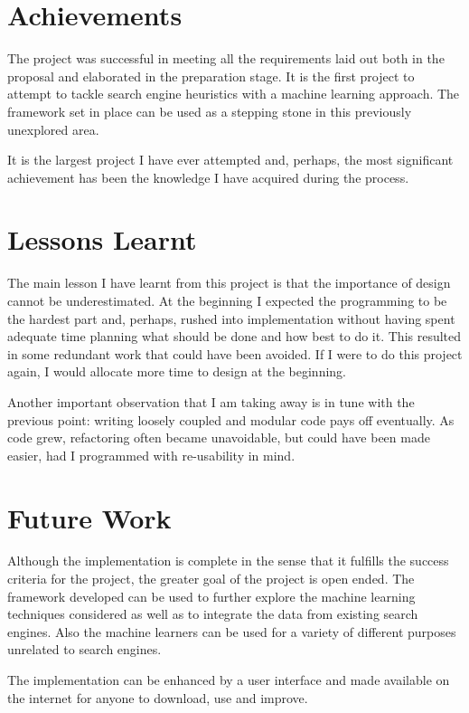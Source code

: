 \documentclass[12pt,a4paper,notitlepage,twoside]{scrbook}
\begin{document}
\section{Achievements}
The project was successful in meeting all the requirements laid out both in the proposal
and elaborated in the preparation stage. It is the first project to attempt to tackle search
engine heuristics with a machine learning approach. The framework set in place 
can be used as a stepping stone in this previously unexplored area.

It is the largest project I have ever attempted and, perhaps, the most significant
achievement has been the knowledge I have acquired during the process.

\section{Lessons Learnt}
The main lesson I have learnt from this project is that the importance of design cannot be
underestimated. At the beginning I expected the programming to be the hardest part and,
perhaps, rushed into implementation without having spent adequate time planning what
should be done and how best to do it. This resulted in some redundant work that
could have been avoided. If I were to do this project again, I would allocate more time to
design at the beginning.

Another important observation that I am taking away is in tune with the previous point:
writing loosely coupled and modular code pays off eventually. As code grew, refactoring
often became unavoidable, but could have been made easier, had I programmed with
re-usability in mind.

\section{Future Work}
Although the implementation is complete in the sense that it fulfills the success criteria
for the project, the greater goal of the project is open ended. The framework developed can be
used to further explore the machine learning techniques considered as well as to integrate
the data from existing search engines. Also the machine learners can be used for a
variety of different purposes unrelated to search engines.

The implementation can be enhanced by a user interface and made available on the internet
for anyone to download, use and improve.


\end{document}
